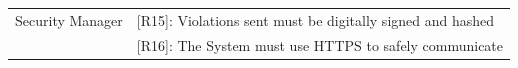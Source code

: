 \documentclass{article}
\begin{document}
\begin{center}
\begin{tabular}{ | l | l |}
        \hline
        Security Manager & [R15]: Violations sent must be digitally signed and hashed \\
                         & [R16]: The System must use HTTPS to safely communicate \\
        \hline
    \end{tabular}
    \end{center}
\end{document}
